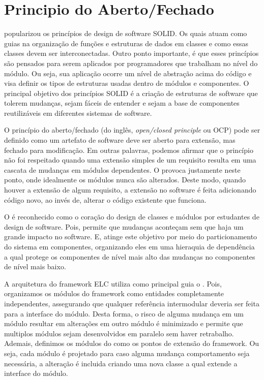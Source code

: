 \documentclass[12pt]{tcc}
\begin{document}
	\section{Principio do Aberto/Fechado}
	\label{cap:solid-ocp}
	\citet{MartinCleanArchtecture} popularizou os princípios de design de software SOLID.
	Os quais atuam como guias na organização de funções e estruturas de dados em classes e como essas classes devem ser interconectadas.
	Outro ponto importante, é que esses princípios são pensados para serem aplicados por programadores que trabalham no nível do módulo.
	Ou seja, sua aplicação ocorre um nível de abstração acima do código e visa definir os tipos de estruturas usadas dentro de módulos e componentes.
	O principal objetivo dos princípios SOLID é a criação de estruturas de software que tolerem mudanças, sejam fáceis de entender e sejam a base de componentes reutilizáveis em diferentes sistemas de software.

	O princípio do aberto/fechado (do inglês, \emph{open/closed principle} ou OCP) pode ser definido como um artefato de software deve ser aberto para extensão, mas fechado para modificação. \citep{Meyer1988ObjectOrientedSoftwareConstruction}
	Em outras palavras, podemos afirmar que o princípio não foi respeitado quando uma extensão simples de um requisito resulta em uma cascata de mudanças em módulos dependentes.
	O  provoca justamente neste ponto, onde idealmente os módulos nunca são alterados.
	Deste modo, quando houver a extensão de algum requisito, a extensão no software é feita adicionando código novo, ao invés de, alterar o código existente que funciona. \citep{Martin1996TheOpen-ClosedPrinciple}

	O  é reconhecido como o coração do design de classes e módulos por estudantes de design de software. \citep{CleanArchtecture}
	Pois, permite que mudanças aconteçam sem que haja um grande impacto no software.
	E, atinge este objetivo por meio do particionamento do sistema em componentes, organizando eles em uma hieraquia de dependência a qual protege os componentes de nível mais alto das mudanças no componentes de nível mais baixo. \citep{CleanArchtecture}

	A arquitetura do framework ELC utiliza como principal guia o .
	Pois, organizamos os módulos do framework como entidades completamente independentes, assegurando que qualquer referência intermodular deveria ser feita para a interface do módulo.
	Desta forma, o risco de alguma mudança em um módulo resultar em alterações em outro módulo é minimizado e permite que multiplos módulos sejam desenvolvidos em paralelo sem haver retrabalho.
	Ademais, definimos os módulos do  como os pontos de extensão do framework.
	Ou seja, cada módulo é projetado para caso alguma mudança comportamento seja necessária, a alteração é incluida criando uma nova classe a qual extende a interface do módulo.
\end{document}
